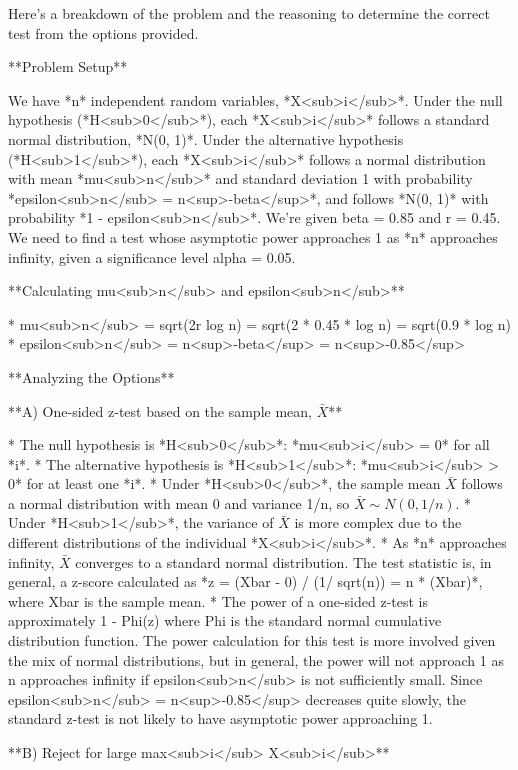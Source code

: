Here's a breakdown of the problem and the reasoning to determine the correct test from the options provided.

**Problem Setup**

We have *n* independent random variables, *X<sub>i</sub>*.  Under the null hypothesis (*H<sub>0</sub>*), each *X<sub>i</sub>* follows a standard normal distribution, *N(0, 1)*.  Under the alternative hypothesis (*H<sub>1</sub>*), each *X<sub>i</sub>* follows a normal distribution with mean *mu<sub>n</sub>* and standard deviation 1 with probability *epsilon<sub>n</sub> = n<sup>-beta</sup>*, and follows *N(0, 1)* with probability *1 - epsilon<sub>n</sub>*. We're given beta = 0.85 and r = 0.45. We need to find a test whose asymptotic power approaches 1 as *n* approaches infinity, given a significance level alpha = 0.05.

**Calculating mu<sub>n</sub> and epsilon<sub>n</sub>**

*   mu<sub>n</sub> = sqrt(2r log n) = sqrt(2 * 0.45 * log n) = sqrt(0.9 * log n)
*   epsilon<sub>n</sub> = n<sup>-beta</sup> = n<sup>-0.85</sup>

**Analyzing the Options**

**A) One-sided z-test based on the sample mean,  $\bar{X}$**

*   The null hypothesis is *H<sub>0</sub>*: *mu<sub>i</sub> = 0* for all *i*.
*   The alternative hypothesis is *H<sub>1</sub>*: *mu<sub>i</sub> > 0* for at least one *i*.
*   Under *H<sub>0</sub>*, the sample mean $\bar{X}$ follows a normal distribution with mean 0 and variance 1/n, so $\bar{X} \sim N(0, 1/n)$.
*   Under *H<sub>1</sub>*, the variance of $\bar{X}$ is more complex due to the different distributions of the individual *X<sub>i</sub>*.
*   As *n* approaches infinity, $\bar{X}$ converges to a standard normal distribution. The test statistic is, in general, a z-score calculated as  *z = (Xbar - 0) / (1/ sqrt(n)) = n * (Xbar)*, where Xbar is the sample mean.
*   The power of a one-sided z-test is approximately 1 - Phi(z) where Phi is the standard normal cumulative distribution function.  The power calculation for this test is more involved given the mix of normal distributions, but in general, the power will not approach 1 as n approaches infinity if epsilon<sub>n</sub> is not sufficiently small.  Since epsilon<sub>n</sub> = n<sup>-0.85</sup> decreases quite slowly, the standard z-test is not likely to have asymptotic power approaching 1.

**B) Reject for large max<sub>i</sub> X<sub>i</sub>**


